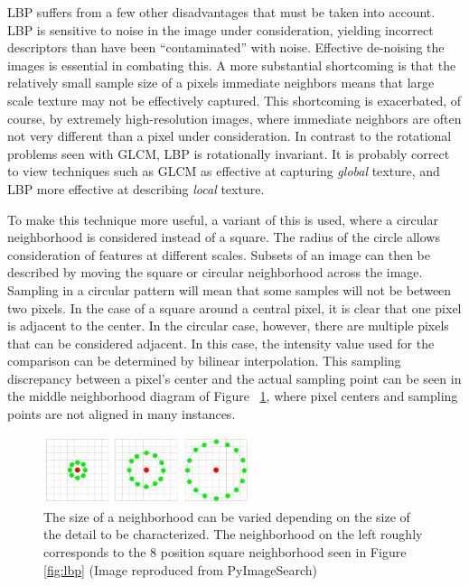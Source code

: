 \documentclass[letterpaper, notitlepage]{report}
\begin{document}
LBP suffers from a few other disadvantages that must be taken into account. LBP is sensitive to noise in the image under consideration, yielding incorrect descriptors than have been ``contaminated'' with noise. Effective de-noising the images is essential in combating this. A more substantial shortcoming is that the relatively small sample size of a pixels immediate neighbors means that large scale texture may not be effectively captured. This shortcoming is exacerbated, of course, by extremely high-resolution images, where immediate neighbors are often not very different than a pixel under consideration. In contrast to the rotational problems seen with GLCM, LBP is rotationally invariant. It is probably correct to view techniques such as GLCM as effective at capturing \textit{global} texture, and LBP more effective at describing \textit{local} texture.

To make this technique more useful, a variant of this is used, where a circular neighborhood is considered instead of a square. The radius of the circle allows consideration of features at different scales.  Subsets of an image can then be described by moving the square or circular neighborhood across the image.  Sampling in a circular pattern will mean that some samples will not be between two pixels. In the case of a square around a central pixel, it is clear that one pixel is adjacent to the center. In the circular case, however, there are multiple pixels that can be considered adjacent. In this case, the intensity value used for the comparison can be determined by bilinear interpolation. This sampling discrepancy between a pixel's center and the actual sampling point can be seen in the middle neighborhood diagram of Figure ~\ref{fig:lbp-circular}, where pixel centers and sampling points are not aligned in many instances.

\begin{figure}[H]
	\centering
	\includegraphics[height=2cm]{./figures/lbp_circular.jpg}	
	\caption[Local Binary Pattern circular neighborhoods]{The size of a neighborhood can be varied depending on the size of the detail to be characterized. The neighborhood on the left roughly corresponds to the 8 position square neighborhood seen in Figure \ref{fig:lbp} (Image reproduced from PyImageSearch)}
	\label{fig:lbp-circular}
\end{figure}
\end{document}
